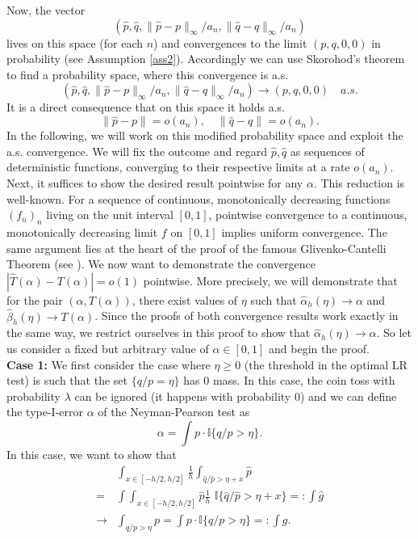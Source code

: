 Now, the vector 
\[
(\hat p, \hat q, \|\hat p-p\|_\infty/a_n, \|\hat q-q\|_\infty/a_n)
\]
lives on this space (for each $n$) and convergences to the limit $(p,q,0,0)$ in probability (see Assumption \ref{ass2}). Accordingly we can use Skorohod's theorem to find a probability space, where this convergence is a.s. 
\[
(\hat p, \hat q, \|\hat p-p\|_\infty/a_n, \|\hat q-q\|_\infty/a_n) \to (p,q,0,0) \quad a.s.
\]
It is a direct consequence that on this space it holds a.s.
\[
\|\hat p-p\| =o(a_n), \quad \|\hat q-q\| =o(a_n).
\]
In the following, we will work on this modified probability space and exploit the a.s. convergence. We will fix the outcome and regard $\hat p, \hat q$ as sequences of deterministic functions, converging to their respective limits at a rate $o(a_n)$.\\
    Next, it suffices to show the desired result pointwise for any $\alpha$. This reduction is well-known. For a sequence of  continuous, monotonically decreasing functions $(f_n)_n$ living on the unit interval $[0,1]$, pointwise convergence  to a continuous, monotonically decreasing limit $f$ on $[0,1]$ implies uniform convergence. The same argument lies at the heart of the proof of the famous Glivenko-Cantelli Theorem (see \cite{vaart:wellner:1996}). We now want to demonstrate the convergence $|\hat T(\alpha) -T(\alpha)|=o(1)$ pointwise. More precisely, we will demonstrate that for the pair $(\alpha, T(\alpha))$, there exist values of $\eta$ such that $\hat \alpha_h(\eta) \to \alpha$ and $\hat\beta_h(\eta) \to T(\alpha)$. Since the proofs of both convergence results work exactly in the same way, we restrict ourselves in this proof to show that $\hat \alpha_h(\eta) \to \alpha$. So let us consider a fixed but arbitrary value of $\alpha \in [0,1]$ and begin the proof.\\
    \textbf{Case 1:} We first consider the case where $\eta\ge 0$ (the threshold in the optimal LR test) is such that the set $\{q/p=\eta\}$ has $0$ mass. In this case, the coin toss with probability $\lambda$ can be ignored (it happens with probability $0$) and  we can define the type-I-error  $\alpha$ of the Neyman-Pearson test as 
    \[
\alpha = \int p \cdot \mathbb{I}\{q/p  > \eta\}.
\]
In this case, we want to show that 
\begin{align*}
& \int_{x \in [-h/2,h/2]} \frac{1}{h}\int_{\hat q /\hat p  > \eta +x} \hat p \\
=& \int  \int_{x \in [-h/2,h/2]}  \hat p \frac{1}{h}\,\,\mathbb{I}\{ \hat q /\hat p  > \eta +x\}=:\int \hat g \\
\to &  \int_{q/p  > \eta}  p  = \int p \cdot \mathbb{I}\{q/p  > \eta\} =:\int g .
\end{align*}
